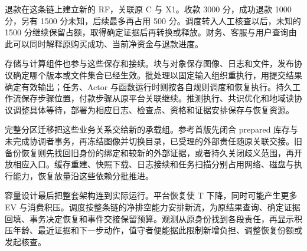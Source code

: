 退款在这条链上建立新的 RF，关联原 C 与 X1。收款 3000 分，成功退款 1000 分，另有 1500 分未知，后续最多再占用 500 分。调度转入人工核查以后，未知的 1500 分继续保留占额，取得确定证据后再转换或释放。财务、客服与用户查询由此可以同时解释原购买成功、当前净资金与退款进度。

存储与计算组件也参与这些保存和接续。块与对象保存图像、日志和文件，发布协议确定哪个版本或文件集合已经生效。批处理以固定输入组织重执行，用提交结果确定有效输出；任务、Actor 与函数运行时则按各自规则调度和恢复执行。持久工作流保存步骤位置，付款步骤从原平台关联继续。推测执行、共识优化和地域读协议调整具体等待，部署为相应日志、检查点、资格和证据安排保存与恢复资源。

完整分区迁移把这些业务关系交给新的承载组。参考首版先闭合 prepared 库存与未完成协调者事务，再冻结图像并切换目录，已受理的外部责任随原关联交接。旧备份恢复则先找回旧身份的绑定和较新的外部证据，或者持久关闭歧义范围，再开放相应入口。缓存重建、快照下载、日志接续和任务扫描分别占用网络、磁盘与执行能力，恢复放量沿这些依赖分批推进。

容量设计最后把整套架构连到实际运行。平台恢复使 T 下降，同时可能产生更多 EV 与消费积压。调度按整条链的净排空能力安排新流，为原结果查询、确定证据回填、事务决定恢复和事件交接保留预算。观测从原身份找到各段责任，再显示积压年龄、最近证据和下一步动作，值守者便能据此限制新增负担、调整恢复份额或发起核查。
\FloatBarrier
